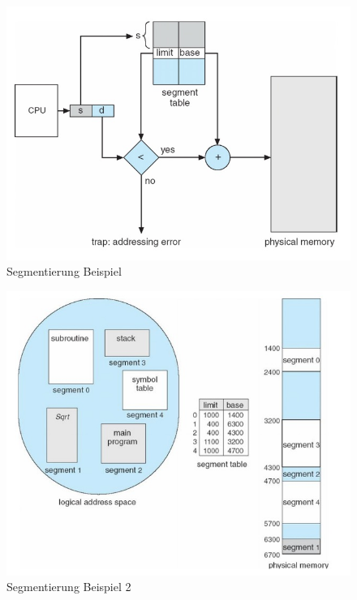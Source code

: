 \documentclass[a4paper]{scrreprt}
\begin{document}
\begin{itemize}
 \begin{figure}[ht]
\centering
\includegraphics[scale=0.50]{segmentierung1.png}
\caption{Segmentierung Beispiel}
\end{figure}

\begin{figure}[ht]
\centering
\includegraphics[scale=0.50]{segmentierung2.png}
\caption{Segmentierung Beispiel 2}
\end{figure}
\end{itemize}


\newpage
\end{document}
